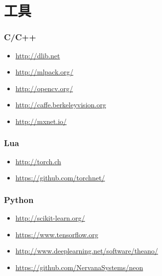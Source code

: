 \documentclass{beamer}
\begin{document}
\section{工具}
\label{sec-7}
\begin{frame}
\frametitle{C/C++}
\label{sec-7-1}

\begin{itemize}
\item \href{http://dlib.net}{http://dlib.net}
\item \href{http://mlpack.org/}{http://mlpack.org/}
\item \href{http://opencv.org/}{http://opencv.org/}
\item \href{http://caffe.berkeleyvision.org}{http://caffe.berkeleyvision.org}
\item \href{http://mxnet.io/}{http://mxnet.io/}
\end{itemize}
\end{frame}
\begin{frame}
\frametitle{Lua}
\label{sec-7-2}

\begin{itemize}
\item \href{http://torch.ch}{http://torch.ch}
\item \href{https://github.com/torchnet/}{https://github.com/torchnet/}
\end{itemize}
\end{frame}
\begin{frame}
\frametitle{Python}
\label{sec-7-3}

\begin{itemize}
\item \href{http://scikit-learn.org/}{http://scikit-learn.org/}
\item \href{https://www.tensorflow.org}{https://www.tensorflow.org}
\item \href{http://www.deeplearning.net/software/theano/}{http://www.deeplearning.net/software/theano/}
\item \href{https://github.com/NervanaSystems/neon}{https://github.com/NervanaSystems/neon}
\end{itemize}
\end{frame}
\end{document}
